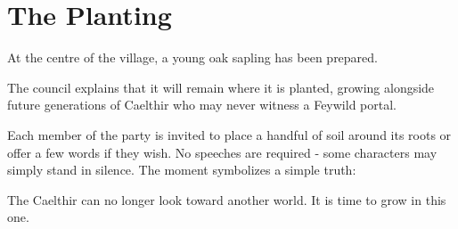 \section*{The Planting}
{\entryfont At the centre of the village, a young oak sapling has been prepared.

The council explains that it will remain where it is planted, growing alongside future generations of Caelthir who may never witness a Feywild portal.

Each member of the party is invited to place a handful of soil around its roots or offer a few words if they wish. No speeches are required - some characters may simply stand in silence. The moment symbolizes a simple truth:

The Caelthir can no longer look toward another world. It is time to grow in this one.}